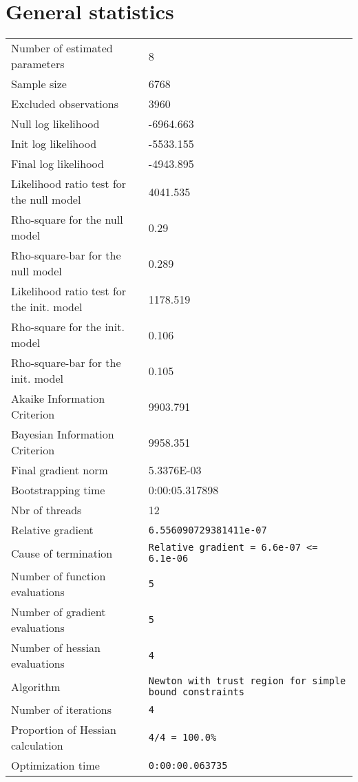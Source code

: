 \section{General statistics}
\begin{tabular}{ll}
Number of estimated parameters & 8 \\
Sample size & 6768 \\
Excluded observations & 3960 \\
Null log likelihood & -6964.663 \\
Init log likelihood & -5533.155 \\
Final log likelihood & -4943.895 \\
Likelihood ratio test for the null model & 4041.535 \\
Rho-square for the null model & 0.29 \\
Rho-square-bar for the null model & 0.289 \\
Likelihood ratio test for the init. model & 1178.519 \\
Rho-square for the init. model & 0.106 \\
Rho-square-bar for the init. model & 0.105 \\
Akaike Information Criterion & 9903.791 \\
Bayesian Information Criterion & 9958.351 \\
Final gradient norm & 5.3376E-03 \\
Bootstrapping time & 0:00:05.317898 \\
Nbr of threads & 12 \\
Relative gradient & \verb$6.556090729381411e-07$ \\
Cause of termination & \verb$Relative gradient = 6.6e-07 <= 6.1e-06$ \\
Number of function evaluations & \verb$5$ \\
Number of gradient evaluations & \verb$5$ \\
Number of hessian evaluations & \verb$4$ \\
Algorithm & \verb$Newton with trust region for simple bound constraints$ \\
Number of iterations & \verb$4$ \\
Proportion of Hessian calculation & \verb$4/4 = 100.0%$ \\
Optimization time & \verb$0:00:00.063735$ \\
\end{tabular}

